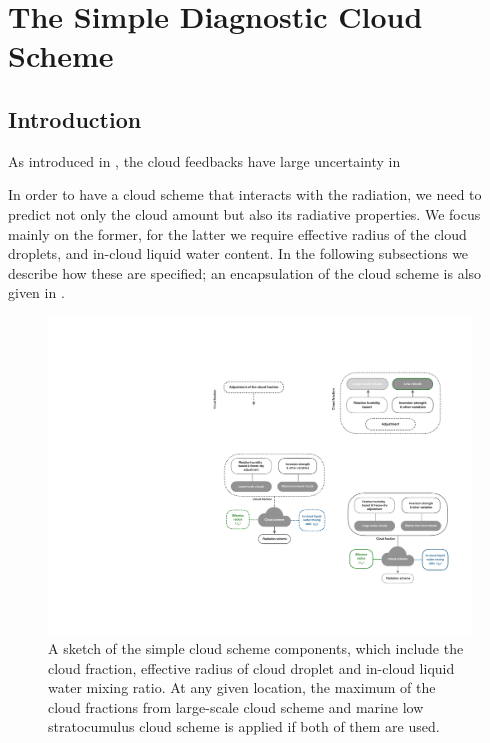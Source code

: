 \chapter{The Simple Diagnostic Cloud Scheme}
\label{chp:simple_cld_scheme}

\section{Introduction}

As introduced in , the cloud feedbacks have large uncertainty in

In order to have a cloud scheme that interacts with the radiation, we need to predict not only the cloud amount but also its radiative properties. We focus mainly on the former, for the latter we require effective radius of the cloud droplets, and in-cloud liquid water content. In the following subsections we describe how these are specified; an encapsulation of the cloud scheme is also given in . 

\begin{figure}[t]
	\centering
	\includegraphics[width=0.7\linewidth]{figs/simple_cld_scheme/diag_cld_scheme_summary.pdf}
	\caption{A sketch of the simple cloud scheme components, which include the cloud fraction, effective radius of cloud droplet and in-cloud liquid water mixing ratio. At any given location, the maximum of the cloud fractions from large-scale cloud scheme and marine low stratocumulus cloud scheme is applied if both of them are used.} 
	\label{fig:cld_scheme_summary}
\end{figure}

